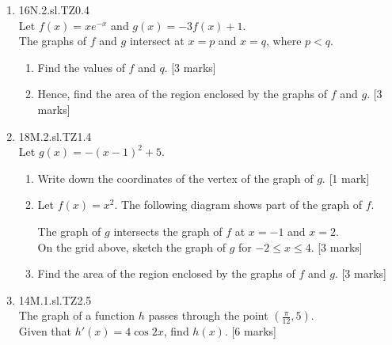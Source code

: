 \documentclass[12pt, twoside]{article}
\begin{document}
\begin{enumerate}
    \item 16N.2.sl.TZ0.4\\
    Let $f(x)=xe^{-x}$ and $g(x)=-3f(x)+1$.\\
    The graphs of $f$ and $g$ intersect at $x=p$ and $x=q$, where $p<q$.
    \begin{enumerate}
      \item Find the values of $f$ and $q$. [3 marks]
      \item Hence, find the area of the region enclosed by the graphs of $f$ and $g$. [3 marks]
    \end{enumerate}

    \item 18M.2.sl.TZ1.4\\
    Let  $g(x)=-(x-1)^2+5$.
    \begin{enumerate}
      \item Write down the coordinates of the vertex of the graph of $g$. [1 mark]
      \item Let $f(x)=x^2$. The following diagram shows part of the graph of $f$.
        \begin{center}
        \end{center}
      The graph of $g$ intersects the graph of $f$ at $x=-1$ and $x=2$.\\
      On the grid above, sketch the graph of $g$ for $-2 \leq x \leq 4$. [3 marks]
      \item Find the area of the region enclosed by the graphs of $f$ and $g$. [3 marks]
    \end{enumerate}

    \item 14M.1.sl.TZ2.5\\
    The graph of a function $h$ passes through the point $(\frac{\pi}{12},5)$.\\
    Given that $h'(x)=4 \cos 2x$, find $h(x)$. [6 marks]
    

\end{enumerate}
\end{document}
